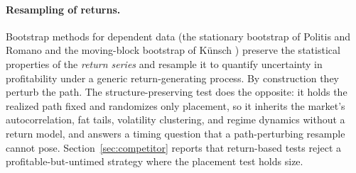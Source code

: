 \documentclass[preprint,12pt]{elsarticle}
\theoremstyle{definition}
\begin{document}
\paragraph{Resampling of returns.} Bootstrap methods for dependent data (the stationary
bootstrap of Politis and Romano \cite{politisromano1994} and the moving-block bootstrap of
K\"unsch \cite{Kunsch1989}) preserve the statistical properties of the \emph{return
series} and resample it to quantify uncertainty in profitability under a generic
return-generating process. By construction they perturb the path. The structure-preserving
test does the opposite: it holds the realized path fixed and randomizes only placement, so
it inherits the market's autocorrelation, fat tails, volatility clustering, and regime
dynamics without a return model, and answers a timing question that a path-perturbing
resample cannot pose. Section~\ref{sec:competitor} reports that
return-based tests reject a profitable-but-untimed strategy where the placement test holds
size.
\end{document}
